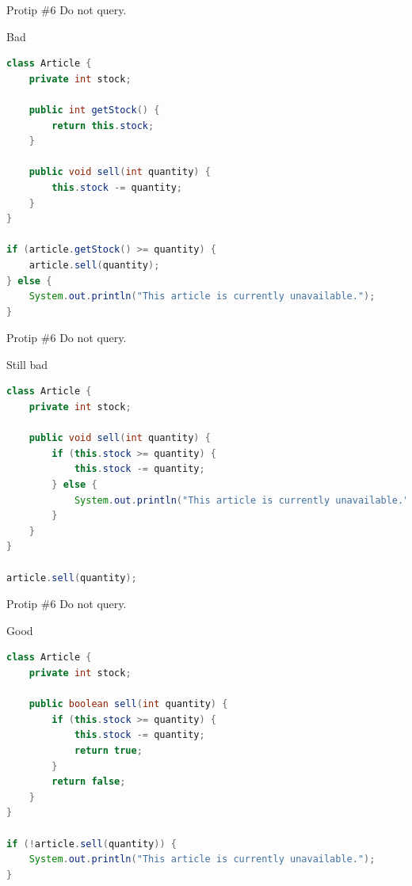 \documentclass[18pt]{beamer}
\begin{document}
\begin{frame}[fragile]{Protip \#6 Do not query.}
    \begin{alertblock}{Bad}
        \begin{lstlisting}[language=Java,basicstyle=\scriptsize]
class Article {
    private int stock;

    public int getStock() {
        return this.stock;
    }

    public void sell(int quantity) {
        this.stock -= quantity;
    }
}

if (article.getStock() >= quantity) {
    article.sell(quantity);
} else {
    System.out.println("This article is currently unavailable.");
}
        \end{lstlisting}
    \end{alertblock}
\end{frame}

\begin{frame}[fragile]{Protip \#6 Do not query.}
    \begin{alertblock}{Still bad}
        \begin{lstlisting}[language=Java,basicstyle=\scriptsize]
class Article {
    private int stock;

    public void sell(int quantity) {
        if (this.stock >= quantity) {
            this.stock -= quantity;
        } else {
            System.out.println("This article is currently unavailable.");
        }
    }
}

article.sell(quantity);
        \end{lstlisting}
    \end{alertblock}
\end{frame}

\begin{frame}[fragile]{Protip \#6 Do not query.}
    \begin{exampleblock}{Good}
        \begin{lstlisting}[language=Java,basicstyle=\scriptsize]
class Article {
    private int stock;

    public boolean sell(int quantity) {
        if (this.stock >= quantity) {
            this.stock -= quantity;
            return true;
        }
        return false;
    }
}

if (!article.sell(quantity)) {
    System.out.println("This article is currently unavailable.");
}
        \end{lstlisting}
    \end{exampleblock}
\end{frame}
\end{document}

